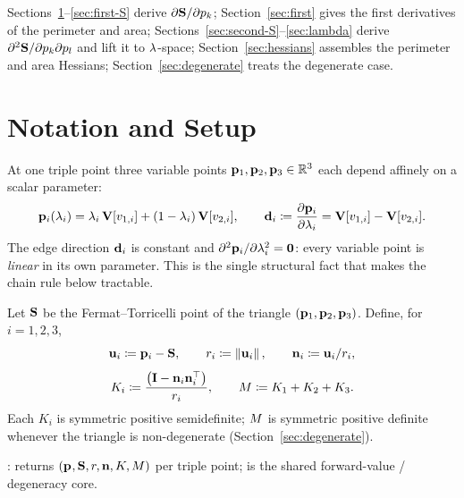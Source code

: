 \documentclass[11pt,a4paper]{article}
\begin{document}
Sections~\ref{sec:setup}--\ref{sec:first-S} derive $\partial\mathbf{S}/\partial p_k$;
Section~\ref{sec:first} gives the first derivatives of the perimeter and area;
Sections~\ref{sec:second-S}--\ref{sec:lambda} derive
$\partial^2\mathbf{S}/\partial p_k\partial p_l$ and lift it to $\lambda$-space;
Section~\ref{sec:hessians} assembles the perimeter and area Hessians;
Section~\ref{sec:degenerate} treats the degenerate case.

\section{Notation and Setup}
\label{sec:setup}

At one triple point three variable points $\mathbf{p}_{1},\mathbf{p}_{2},\mathbf{p}_{3}\in\mathbb{R}^3$
each depend affinely on a scalar parameter:
\begin{equation}
  \mathbf{p}_{i}(\lambda_i) = \lambda_i\,\mathbf{V}[v_{1,i}] + (1-\lambda_i)\,\mathbf{V}[v_{2,i}],
  \qquad
  \mathbf{d}_{i} \coloneqq \dfrac{\partial \mathbf{p}_{i}}{\partial \lambda_i} = \mathbf{V}[v_{1,i}] - \mathbf{V}[v_{2,i}].
\end{equation}
The edge direction $\mathbf{d}_{i}$ is constant and $\partial^2\mathbf{p}_{i}/\partial\lambda_i^2
= \mathbf{0}$: every variable point is \emph{linear} in its own parameter.
This is the single structural fact that makes the chain rule below tractable.

Let $\mathbf{S}$ be the Fermat--Torricelli point of the triangle
$(\mathbf{p}_{1},\mathbf{p}_{2},\mathbf{p}_{3})$.  Define, for $i = 1,2,3$,
\begin{equation}
  \mathbf{u}_i \coloneqq \mathbf{p}_{i} - \mathbf{S},\qquad
  r_i \coloneqq \left\|\mathbf{u}_i\right\|,\qquad
  \mathbf{n}_i \coloneqq \mathbf{u}_i / r_i,
\end{equation}
\begin{equation}
  K_i \coloneqq \frac{\bigl(\mathbf{I} - \mathbf{n}_i \mathbf{n}_i^\top\bigr)}{r_i},\qquad
  M \coloneqq K_1 + K_2 + K_3.
  \label{eq:KM}
\end{equation}
Each $K_i$ is symmetric positive semidefinite; $M$ is symmetric positive
definite whenever the triangle is non-degenerate (Section~\ref{sec:degenerate}).

\begin{tcolorbox}[colback=blue!4!white, colframe=blue!40!black,
                  title={Code: triple-point geometry}, fontupper=\small]
:
 returns $(\mathbf{p}_{}, \mathbf{S}, r, \mathbf{n}, K,
M)$ per triple point;  is the shared
forward-value / degeneracy core.
\end{tcolorbox}
\end{document}

